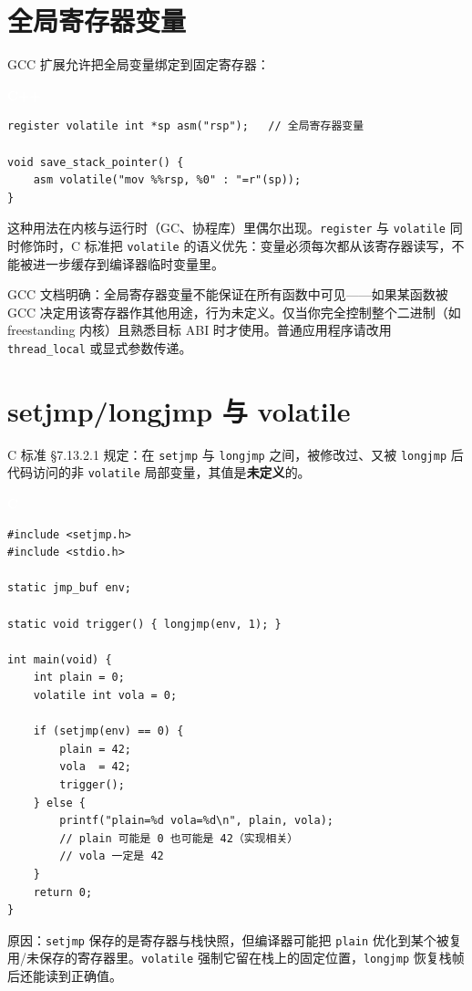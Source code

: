 \documentclass[12pt,a4paper,fontset=fandol]{ctexbook}
\newcommand{\clabel}{%
  \begin{tcolorbox}[enhanced,colback=cheadbg,colframe=cheadbg,
    arc=1mm,boxrule=0mm,left=6pt,right=6pt,top=2pt,bottom=2pt,
    halign=left,oversize]
    \textcolor{white}{\small\bfseries C}
  \end{tcolorbox}\vspace{-4pt}}
\newcommand{\cpplabel}{%
  \begin{tcolorbox}[enhanced,colback=cppheadbg,colframe=cppheadbg,
    arc=1mm,boxrule=0mm,left=6pt,right=6pt,top=2pt,bottom=2pt,
    halign=left,oversize]
    \textcolor{white}{\small\bfseries C++}
  \end{tcolorbox}\vspace{-4pt}}
\newcommand{\kw}[1]{\texttt{#1}}
\begin{document}
\section{全局寄存器变量}\label{sec:global-register-var}

GCC 扩展允许把全局变量绑定到固定寄存器：

\cpplabel
\begin{lstlisting}[style=cppstyle]
register volatile int *sp asm("rsp");   // 全局寄存器变量

void save_stack_pointer() {
    asm volatile("mov %%rsp, %0" : "=r"(sp));
}
\end{lstlisting}

这种用法在内核与运行时（GC、协程库）里偶尔出现。\kw{register} 与 \kw{volatile} 同时修饰时，C 标准把 \kw{volatile} 的语义优先：变量必须每次都从该寄存器读写，不能被进一步缓存到编译器临时变量里。

\begin{tcolorbox}[warning={全局寄存器变量极脆弱}]
GCC 文档明确：全局寄存器变量不能保证在所有函数中可见——如果某函数被 GCC 决定用该寄存器作其他用途，行为未定义。仅当你完全控制整个二进制（如 freestanding 内核）且熟悉目标 ABI 时才使用。普通应用程序请改用 \texttt{thread\_local} 或显式参数传递。
\end{tcolorbox}

\section{setjmp/longjmp 与 volatile}\label{sec:setjmp}

C 标准 §7.13.2.1 规定：在 \texttt{setjmp} 与 \texttt{longjmp} 之间，被修改过、又被 \texttt{longjmp} 后代码访问的非 \kw{volatile} 局部变量，其值是\textbf{未定义}的。

\clabel
\begin{lstlisting}[style=cstyle]
#include <setjmp.h>
#include <stdio.h>

static jmp_buf env;

static void trigger() { longjmp(env, 1); }

int main(void) {
    int plain = 0;
    volatile int vola = 0;

    if (setjmp(env) == 0) {
        plain = 42;
        vola  = 42;
        trigger();
    } else {
        printf("plain=%d vola=%d\n", plain, vola);
        // plain 可能是 0 也可能是 42（实现相关）
        // vola 一定是 42
    }
    return 0;
}
\end{lstlisting}

原因：\texttt{setjmp} 保存的是寄存器与栈快照，但编译器可能把 \texttt{plain} 优化到某个被复用/未保存的寄存器里。\kw{volatile} 强制它留在栈上的固定位置，\texttt{longjmp} 恢复栈帧后还能读到正确值。
\end{document}
